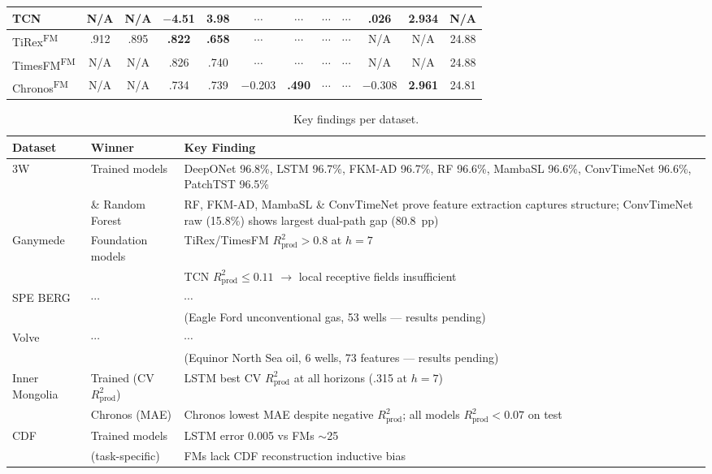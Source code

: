 \documentclass[11pt]{article}
\newcommand{\best}[1]{\textbf{#1}}
\newcommand{\fm}{\textsuperscript{FM}}
\newcommand{\rp}{R^2_\text{prod}}
\begin{document}
\begin{table}[ht]
\begin{tabular}{@{}l cc cc cc cc cc c@{}}
TCN          & N/A & N/A & $-$4.51 & 3.98 & $\cdots$ & $\cdots$ & $\cdots$ & $\cdots$ & .026 & 2.934 & N/A \\
\midrule
TiRex\fm     & .912 & .895 & \best{.822} & \best{.658} & $\cdots$ & $\cdots$ & $\cdots$ & $\cdots$ & N/A & N/A & 24.88 \\
TimesFM\fm   & N/A & N/A & .826 & .740 & $\cdots$ & $\cdots$ & $\cdots$ & $\cdots$ & N/A & N/A & 24.88 \\
Chronos\fm   & N/A & N/A & .734 & .739 & $-$0.203 & \best{.490} & $\cdots$ & $\cdots$ & $-$0.308 & \best{2.961} & 24.81 \\
\bottomrule
\end{tabular}
\end{table}


\begin{table}[ht]
\centering
\caption{Key findings per dataset.}
\label{tab:key_findings}
\small
\begin{tabular}{@{}l l p{9cm}@{}}
\toprule
\textbf{Dataset} & \textbf{Winner} & \textbf{Key Finding} \\
\midrule
3W  & Trained models    & DeepONet 96.8\%, LSTM 96.7\%, FKM-AD 96.7\%, RF 96.6\%, MambaSL 96.6\%, ConvTimeNet 96.6\%, PatchTST 96.5\% \\
    & \& Random Forest  & RF, FKM-AD, MambaSL \& ConvTimeNet prove feature extraction captures structure; ConvTimeNet raw (15.8\%) shows largest dual-path gap (80.8~pp) \\
\midrule
Ganymede & Foundation models & TiRex/TimesFM $\rp > 0.8$ at $h{=}7$ \\
         &                   & TCN $\rp \leq 0.11$ $\to$ local receptive fields insufficient \\
\midrule
SPE BERG & $\cdots$ & $\cdots$ \\
         &        & (Eagle Ford unconventional gas, 53 wells --- results pending) \\
\midrule
Volve & $\cdots$ & $\cdots$ \\
      &        & (Equinor North Sea oil, 6 wells, 73 features --- results pending) \\
\midrule
Inner Mongolia & Trained (CV $\rp$) & LSTM best CV $\rp$ at all horizons (.315 at $h{=}7$) \\
               & Chronos (MAE)      & Chronos lowest MAE despite negative $\rp$; all models $\rp < 0.07$ on test \\
\midrule
CDF & Trained models & LSTM error 0.005 vs FMs $\sim$25 \\
    & (task-specific) & FMs lack CDF reconstruction inductive bias \\
\bottomrule
\end{tabular}
\end{table}
\end{document}
